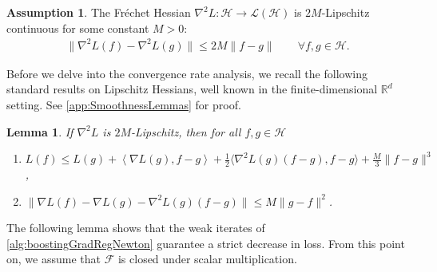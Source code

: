 \documentclass{article}
\theoremstyle{plain}
\newtheorem{lemma}[theorem]{Lemma}
\theoremstyle{definition}
\newtheorem{assumption}[theorem]{Assumption}
\theoremstyle{remark}
\begin{document}
\begin{assumption}\label{assumptionHessLipAndCosine}
    The Fr\'echet Hessian $\nabla^2 L : \mathcal{H} \to \mathcal{L(H)}$ is $2M$-Lipschitz continuous for some constant $M>0$:
    \begin{align*}
        \|\nabla^2L(f)-\nabla^2L(g)\| \leq 2M\|f-g\| \qquad \forall f,g\in \mathcal{H}.
    \end{align*}
\end{assumption}

Before we delve into the convergence rate analysis, we recall the following standard results on Lipschitz Hessians, well known in the finite-dimensional $\mathbb{R}^d$ setting. See \cref{app:SmoothnessLemmas} for proof.

\begin{lemma}\label{lemmaStandardHessianResults}
    If $\nabla^2 L$ is $2M$-Lipschitz, then for all $f,g\in \mathcal{H}$
    \begin{enumerate}
        \item $L(f) \leq L(g) + \left\langle \nabla L(g), f-g\right\rangle + \frac{1}{2}\langle \nabla^2 L(g)(f-g), f-g\rangle + \frac{M}{3}\|f-g\|^3$,
        \item  $\|\nabla L(f) - \nabla L(g) - \nabla^2 L(g)(f-g)\| \leq M\|g-f\|^2$.
    \end{enumerate}
\end{lemma}

The following lemma shows that the weak iterates of \cref{alg:boostingGradRegNewton} guarantee a strict decrease in loss. From this point on, we assume that $\mathcal{F}$ is closed under scalar multiplication.
\end{document}
